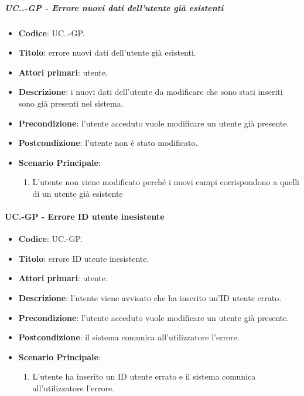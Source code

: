 		\subparagraph{UC\theuccount.\thesubuccount.\thesubsubuccount-GP - Errore nuovi dati dell'utente già esistenti}
		
		\begin{itemize}
			\item \textbf{Codice}: UC\theuccount.\thesubuccount.\thesubsubuccount-GP.
			\item \textbf{Titolo}: errore nuovi dati dell'utente già esistenti.
			\item \textbf{Attori primari}: utente.
			\item \textbf{Descrizione}: i nuovi dati dell'utente da modificare che sono stati inseriti sono già presenti nel sistema.
			\item \textbf{Precondizione}: l'utente acceduto vuole modificare un utente già presente.
			\item \textbf{Postcondizione}: l'utente non è stato modificato.
			\item \textbf{Scenario Principale}:
			\begin{enumerate}
				\item L'utente non viene modificato perché i nuovi campi corrispondono a quelli di un utente già esistente
			\end{enumerate}
		\end{itemize}
	\paragraph{UC\theuccount.\thesubuccount-GP - Errore ID utente inesistente}
		
		\begin{itemize}
			\item \textbf{Codice}: UC\theuccount.\thesubuccount-GP.
			\item \textbf{Titolo}: errore ID utente inesistente.
			\item \textbf{Attori primari}: utente.
			\item \textbf{Descrizione}:  l’utente viene avvisato che ha inserito un'ID utente errato.
			\item \textbf{Precondizione}: l'utente acceduto vuole modificare un utente già presente.
			\item \textbf{Postcondizione}: il sistema comunica all’utilizzatore l’errore.
			\item \textbf{Scenario Principale}:
			\begin{enumerate}
				\item L'utente ha inserito un ID utente errato e il sistema comunica all’utilizzatore l’errore.
			\end{enumerate}
		\end{itemize}